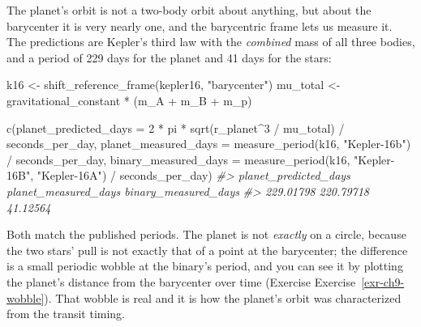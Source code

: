 \documentclass[
  10.5pt,
  letterpaper,
]{scrbook}
\newenvironment{Shaded}{\begin{snugshade}}{\end{snugshade}}
\newcommand{\AttributeTok}[1]{\textcolor[rgb]{0.00,0.00,0.00}{#1}}
\newcommand{\CommentTok}[1]{\textcolor[rgb]{0.00,0.00,0.00}{\textit{#1}}}
\newcommand{\DecValTok}[1]{\textcolor[rgb]{0.00,0.00,0.00}{#1}}
\newcommand{\FunctionTok}[1]{\textcolor[rgb]{0.00,0.00,0.00}{#1}}
\newcommand{\NormalTok}[1]{\textcolor[rgb]{0.00,0.00,0.00}{#1}}
\newcommand{\OtherTok}[1]{\textcolor[rgb]{0.00,0.00,0.00}{#1}}
\newcommand{\SpecialCharTok}[1]{\textcolor[rgb]{0.00,0.00,0.00}{#1}}
\newcommand{\StringTok}[1]{\textcolor[rgb]{0.00,0.00,0.00}{#1}}
\theoremstyle{definition}
\theoremstyle{plain}
\theoremstyle{remark}
\begin{document}
The planet's orbit is not a two-body orbit about anything, but about the
barycenter it is very nearly one, and the barycentric frame lets us
measure it. The predictions are Kepler's third law with the
\emph{combined} mass of all three bodies, and a period of 229 days for
the planet and 41 days for the stars:

\begin{Shaded}
\begin{Highlighting}[]
\NormalTok{k16 }\OtherTok{\textless{}{-}} \FunctionTok{shift\_reference\_frame}\NormalTok{(kepler16, }\StringTok{"barycenter"}\NormalTok{)}
\NormalTok{mu\_total }\OtherTok{\textless{}{-}}\NormalTok{ gravitational\_constant }\SpecialCharTok{*}\NormalTok{ (m\_A }\SpecialCharTok{+}\NormalTok{ m\_B }\SpecialCharTok{+}\NormalTok{ m\_p)}

\FunctionTok{c}\NormalTok{(}\AttributeTok{planet\_predicted\_days =} \DecValTok{2} \SpecialCharTok{*}\NormalTok{ pi }\SpecialCharTok{*} \FunctionTok{sqrt}\NormalTok{(r\_planet}\SpecialCharTok{\^{}}\DecValTok{3} \SpecialCharTok{/}\NormalTok{ mu\_total) }\SpecialCharTok{/}\NormalTok{ seconds\_per\_day,}
  \AttributeTok{planet\_measured\_days  =} \FunctionTok{measure\_period}\NormalTok{(k16, }\StringTok{"Kepler{-}16b"}\NormalTok{) }\SpecialCharTok{/}\NormalTok{ seconds\_per\_day,}
  \AttributeTok{binary\_measured\_days  =} \FunctionTok{measure\_period}\NormalTok{(k16, }\StringTok{"Kepler{-}16B"}\NormalTok{, }\StringTok{"Kepler{-}16A"}\NormalTok{) }\SpecialCharTok{/}
\NormalTok{                          seconds\_per\_day)}
\CommentTok{\#\textgreater{} planet\_predicted\_days  planet\_measured\_days  binary\_measured\_days }
\CommentTok{\#\textgreater{}             229.01798             220.79718              41.12564}
\end{Highlighting}
\end{Shaded}

Both match the published periods. The planet is not \emph{exactly} on a
circle, because the two stars' pull is not exactly that of a point at
the barycenter; the difference is a small periodic wobble at the
binary's period, and you can see it by plotting the planet's distance
from the barycenter over time (Exercise Exercise~\ref{exr-ch9-wobble}).
That wobble is real and it is how the planet's orbit was characterized
from the transit timing.
\end{document}
